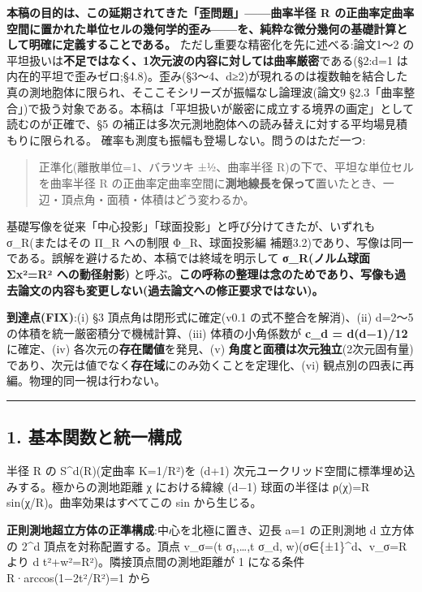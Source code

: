 \documentclass[
]{ltjsarticle}
\begin{document}
\textbf{本稿の目的は、この延期されてきた「歪問題」------曲率半径 R
の正曲率定曲率空間に置かれた単位セルの幾何学的歪み------を、純粋な微分幾何の基礎計算として明確に定義することである。}
ただし重要な精密化を先に述べる:論文1〜2
の平坦扱いは\textbf{不足ではなく、1次元波の内容に対しては曲率厳密}である(§2:d=1
は内在的平坦で歪みゼロ;§4.8)。歪み(§3〜4、d≥2)が現れるのは複数軸を結合した真の測地胞体に限られ、そここそシリーズが振幅なし論理波(論文9
§2.3「曲率整合」)で扱う対象である。本稿は「平坦扱いが厳密に成立する境界の画定」として読むのが正確で、§5
の補正は多次元測地胞体への読み替えに対する平均場見積もりに限られる。
確率も測度も振幅も登場しない。問うのはただ一つ:

\begin{quote}
正準化(離散単位=1、バラツキ ±½、曲率半径
R)の下で、平坦な単位セルを曲率半径 R
の正曲率定曲率空間に\textbf{測地線長を保って}置いたとき、一辺・頂点角・面積・体積はどう変わるか。
\end{quote}

基礎写像を従来「中心投影」「球面投影」と呼び分けてきたが、いずれも
σ\_R(またはその Π\_R への制限 Φ\_R、球面投影編
補題3.2)であり、写像は同一である。誤解を避けるため、本稿では終域を明示して
\textbf{σ\_R(ノルム球面 Σx²=R² への動径射影)}
と呼ぶ。\textbf{この呼称の整理は念のためであり、写像も過去論文の内容も変更しない(過去論文への修正要求ではない)。}

\textbf{到達点(FIX)}:(i) §3 頂点角は閉形式に確定(v0.1
の式不整合を解消)、(ii) d=2〜5 の体積を統一厳密積分で機械計算、(iii)
体積の小角係数が \textbf{c\_d = d(d−1)/12} に確定、(iv)
各次元の\textbf{存在閾値}を発見、(v)
\textbf{角度と面積は次元独立}(2次元固有量)であり、次元は値でなく\textbf{存在域}にのみ効くことを定理化、(vi)
観点別の四表に再編。物理的同一視は行わない。

\begin{center}\rule{0.5\linewidth}{0.5pt}\end{center}

\subsection{1.
基本関数と統一構成}\label{ux57faux672cux95a2ux6570ux3068ux7d71ux4e00ux69cbux6210}

半径 R の S\^{}d(R)(定曲率 K=1/R²)を (d+1)
次元ユークリッド空間に標準埋め込みする。極からの測地距離 χ における緯線
(d−1) 球面の半径は ρ(χ)=R sin(χ/R)。曲率効果はすべてこの sin
から生じる。

\textbf{正則測地超立方体の正準構成}:中心を北極に置き、辺長 a=1
の正則測地 d 立方体の 2\^{}d 頂点を対称配置する。頂点 v\_σ=(t
σ₁,\ldots,t σ\_d, w)(σ∈\{±1\}\^{}d、\textbar v\_σ\textbar=R より d
t²+w²=R²)。隣接頂点間の測地距離が 1 になる条件 R·arccos(1−2t²/R²)=1 から
\end{document}
